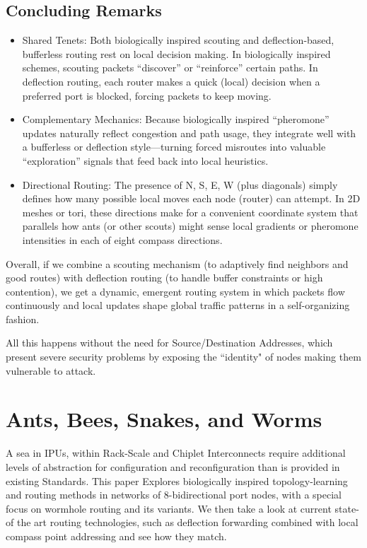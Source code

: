 \documentclass[../OAE-SPEC-MAIN.tex]{subfiles}
\begin{document}
\subsection{Concluding Remarks}

\begin{itemize}
\item Shared Tenets: Both biologically inspired scouting and deflection-based, bufferless routing rest on local decision making. In biologically inspired schemes, scouting packets “discover” or “reinforce” certain paths. In deflection routing, each router makes a quick (local) decision when a preferred port is blocked, forcing packets to keep moving.
\item Complementary Mechanics: Because biologically inspired “pheromone” updates naturally reflect congestion and path usage, they integrate well with a bufferless or deflection style—turning forced misroutes into valuable “exploration” signals that feed back into local heuristics.
\item Directional Routing: The presence of N, S, E, W (plus diagonals) simply defines how many possible local moves each node (router) can attempt. In 2D meshes or tori, these directions make for a convenient coordinate system that parallels how ants (or other scouts) might sense local gradients or pheromone intensities in each of eight compass directions.
\end{itemize}

Overall, if we combine a scouting mechanism (to adaptively find neighbors and good routes) with deflection routing (to handle buffer constraints or high contention), we get a dynamic, emergent routing system in which packets flow continuously and local updates shape global traffic patterns in a self-organizing fashion.

All this happens without the need for Source/Destination Addresses, which present severe security problems by exposing the ``identity" of nodes making them vulnerable to attack.




\newpage
\section{Ants, Bees, Snakes, and Worms}

A sea in IPUs, within Rack-Scale and Chiplet Interconnects require additional levels of abstraction for configuration and reconfiguration than is provided in existing Standards.   This paper  Explores biologically inspired topology-learning and routing methods in networks of 8-bidirectional port nodes, with a special focus on wormhole routing and its variants. We then take a look at current state-of the art routing technologies, such as deflection forwarding combined with local compass point addressing and see how they match.
\end{document}
